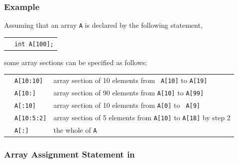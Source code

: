 \subsubsection*{Example}

Assuming that an array {\tt A} is declared by the following statement,

\vspace{0.3cm}

\begin{tabular}{ll}
\hspace{0.5cm} & {\tt int A[100];} \\
\end{tabular}

\vspace{0.3cm}

\hspace{-0.55cm}some array sections can be specified as follows:

\vspace{0.3cm}

\begin{tabular}{lll}
\hspace{0.5cm} & {\tt A[10:10]} & array section of 10 elements from {\tt
 A[10]} to {\tt A[19]} \\
 & {\tt A[10:]} & array section of 90 elements from
		  {\tt A[10]} to {\tt A[99]}\\
 & {\tt A[:10]} & array section of 10 elements from {\tt A[0]} to {\tt
	 A[9]} \\
 & {\tt A[10:5:2]} & array section of 5 elements from {\tt A[10]} to
	 {\tt A[18]} by step 2 \\
 & {\tt A[:]} & the whole of {\tt A} \\
\end{tabular}


\subsubsection{Array Assignment Statement in {\XMPC}}
\label{subsubsec:Array assignment statements in C}




